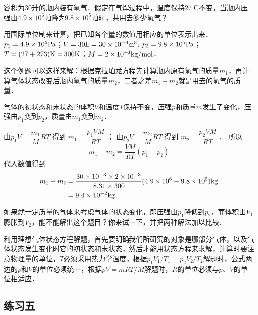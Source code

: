 \begin{example}
容积为30升的瓶内装有氢气．假定在气焊过程中，温度保持27$^\circ$C不变，当瓶内压强由$4. 9\times 10^6$帕降为$9.8\times 10^5$帕时，共用去多少氢气？
\end{example}

\begin{solution}
用国际单位制来计算，把已知各个量的数值用相应的单位表示出来．
$p_1=4.9\times 10^6{\rm Pa}$；$V=30{\rm L}=30\times 10^{-3}{\rm m^3}$; $p_2=9.8\times 10^5{\rm Pa}$；$T=(27+273){\rm K}=300{\rm K}$；$M=2\times 10^{-3}{\rm kg}/{\rm mol}$．

这个例题可以这样来解：根据克拉珀龙方程先计算瓶内原有氢气的质量$m_1$，再计算气体状态改变后瓶内氢气的质量$m_2$，二者之差$m_1-m_2$就是用去的氢气的质量．

气体的初状态和末状态的体积$V$和温度$T$保持不变，压强$p$和质量$m$发生了变化，压强由$p_1$变到$p_2$，质量由$m_1$变到$m_2$．

由$p_1V=\dfrac{m_1}{M}RT$ 得到 $m_1=\dfrac{p_1VM}{RT}$
；
由$p_2V=\dfrac{m_2}{M}RT$ 得到 $m_2=\dfrac{p_2VM}{RT}$
．
所以
\[m_1-m_2=\frac{VM}{RT}(p_1-p_2) \]
代入数值得到
\[\begin{split}
m_1-m_2&=\frac{30\times 10^{-3}\times 2\times 10^{-3}}{8.31\times 300}(4.9\times 10^6-9.8\times 10^5){\rm kg}\\
	&=9.4\times 10^{-2}{\rm kg}
\end{split} \]
\end{solution}

如果就一定质量的气体来考虑气体的状态变化，即压强由$p_1$降低到$p_2$，而体积由$V_1$膨胀到$V_2$，能不能解出这个题目？你来试一下，并把两种解法加以比较．

利用理想气体状态方程解题，首先要明确我们所研究的对象是哪部分气体，以及气体状态发生变化时它的初状态和末状态，然后才能用状态方程来求解，计算时要注意物理量的单位，$T$必须采用热力学温度，根据$p_1V_1/T_1=p_2V_2/T_2$解题时，公式两边的$p$和$V$的单位必须统一，根据$pV=mRT/M$解题时，$R$的单位必须与$p$、$V$的单位相适应．

\subsection*{练习五}

